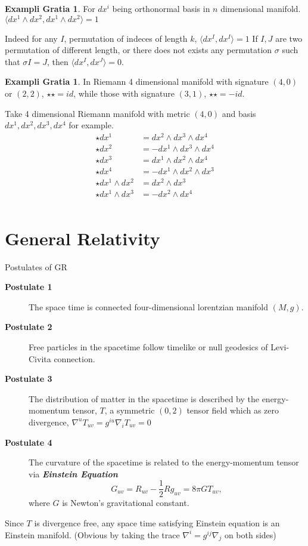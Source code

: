 \documentclass[twocolumn]{article}
\renewcommand{\emph}[1]{\textbf{\textit{#1}}}
\newcommand{\n}{\nabla}
\theoremstyle{definition}
\newtheorem{example}[thm]{Exampli Gratia}
\begin{document}
\begin{example}
	For $dx^i$ being orthonormal basis in $n$ dimensional manifold.
	$\langle dx^1 \wedge dx^2, dx^1 \wedge dx^2 \rangle = 1$

	Indeed for any $I$, permutation of indeces of length $k$,
	$\langle dx^I , dx^I \rangle = 1$
	If $I,J$ are two permutation of different length, or there does not exists any permutation $\sigma$ such that $\sigma I = J$, then $\langle dx^I, dx^J \rangle = 0$.
\end{example}
\begin{example}
In Riemann 4 dimensional manifold with signature $(4, 0)$ or $(2,2)$, $\star \star = id$, while those with signature $(3,1)$, $\star \star = - id$.

Take 4 dimensional Riemann manifold with metric $(4,0)$ and basis $dx^1, dx^2, dx^3, dx^4$ for example.
\begin{align*}
	\star dx^1 &= dx^2 \wedge dx^3 \wedge dx^4 \\
	\star dx^2 &= - dx^1 \wedge dx^3 \wedge dx^4 \\
	\star dx^3 &=  dx^1 \wedge dx^2 \wedge dx^4 \\
	\star dx^4 &= - dx^1 \wedge dx^2 \wedge dx^3 \\
	\star dx^1 \wedge dx^2 &=  dx^2 \wedge dx^3 \\
	\star dx^1 \wedge dx^3 &=  - dx^2 \wedge dx^4 \\
\end{align*}

\end{example}

\section{General Relativity}
\begin{fthm}{Postulates of GR}{}
	\begin{description}
		\item[\textbf{Postulate 1}] The space time is connected four-dimensional lorentzian manifold $(M, g)$.
		\item[\textbf{Postulate 2}] Free particles in the spacetime follow timelike or null geodesics of Levi-Civita connection.
		\item[\textbf{Postulate 3}] The distribution of matter in the spacetime is described by the energy-momentum tensor, $T$, a symmetric $(0,2)$ tensor field which as zero divergence, $\n^u T_{uv} = g^{iu} \n_i T_{uv}= 0$
		\item[\textbf{Postulate 4}] The curvature of the spacetime is related to the energy-momentum tensor via \emph{Einstein Equation}
			$$
			G_{uv} = R_{uv} - \frac{1}{2}R g_{uv} = 8\pi G T_{uv},
			$$
		where $G$ is Newton's gravitational constant.
	\end{description}
	Since $T$ is divergence free, any space time satisfying Einstein equation is an Einstein manifold. 
	(Obvious by taking the trace $\n^i = g^{ij} \n_j$ on both sides)
\end{fthm}
\end{document}
